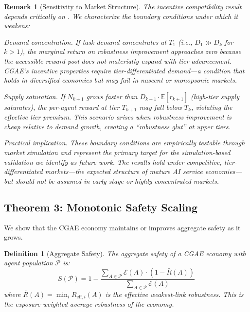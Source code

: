 \documentclass[11pt,a4paper]{article}
\newtheorem{definition}{Definition}
\newtheorem{remark}{Remark}
\newcommand{\E}{\mathbb{E}}
\begin{document}
\begin{remark}[Sensitivity to Market Structure]
\label{rmk:sensitivity}
The incentive compatibility result depends critically on . We characterize the boundary conditions under which it weakens:

\emph{Demand concentration.} If task demand concentrates at $T_1$ (i.e., $D_1 \gg D_k$ for $k > 1$), the marginal return on robustness improvement approaches zero because the accessible reward pool does not materially expand with tier advancement. CGAE's incentive properties require \emph{tier-differentiated demand}---a condition that holds in diversified economies but may fail in nascent or monopsonic markets.

\emph{Supply saturation.} If $N_{k+1}$ grows faster than $D_{k+1} \cdot \E[r_{k+1}]$ (high-tier supply saturates), the per-agent reward at tier $T_{k+1}$ may fall below $T_k$, violating the effective tier premium. This scenario arises when robustness improvement is cheap relative to demand growth, creating a ``robustness glut'' at upper tiers.

\emph{Practical implication.} These boundary conditions are empirically testable through market simulation and represent the primary target for the simulation-based validation we identify as future work. The results hold under competitive, tier-differentiated markets---the expected structure of mature AI service economies---but should not be assumed in early-stage or highly concentrated markets.
\end{remark}

\subsection{Theorem 3: Monotonic Safety Scaling}

We show that the CGAE economy maintains or improves aggregate safety as it grows.

\begin{definition}[Aggregate Safety]
The \emph{aggregate safety} of a CGAE economy with agent population $\mathcal{P}$ is:
\begin{equation}
  S(\mathcal{P}) = 1 - \frac{\sum_{A \in \mathcal{P}} \mathcal{E}(A) \cdot (1 - \bar{R}(A))}{\sum_{A \in \mathcal{P}} \mathcal{E}(A)}
\end{equation}
where $\bar{R}(A) = \min_i R_{\text{eff},i}(A)$ is the effective weakest-link robustness. This is the exposure-weighted average robustness of the economy.
\end{definition}
\end{document}
